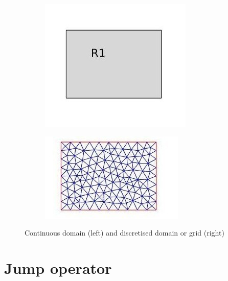 \documentclass[a4paper,oneside,openright,spanish,english]{book}
\begin{document}
\begin{figure}[H]
\begin{subfigure}{0.5\textwidth}
\centering
  \includegraphics[width=\linewidth]{domain.jpg}
  \label{fig:Domain}
\end{subfigure}
\begin{subfigure}{0.5\textwidth}	
\centering
  \includegraphics[width=\linewidth]{grid.jpg}
  \label{fig:Mesh}
\end{subfigure}
\caption{Continuous domain (left) and discretised domain or grid (right)}
\label{fig:continuous_grid_figure}
\end{figure}

\section{Jump operator} \label{jump_operator_ch3}
\end{document}
